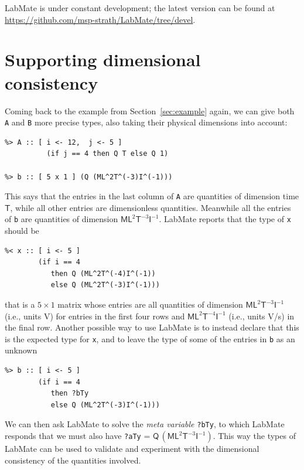 \documentclass{IMEKO2024}
\newcommand{\remph}{\emph}
\begin{document}
LabMate is under constant development; the latest version can be found at \url{https://github.com/msp-strath/LabMate/tree/devel}.

\section{Supporting dimensional consistency}
\label{sec:example-revisited}


Coming back to the example from Section~\ref{sec:example} again, we can give both \texttt{A} and \texttt{B} more precise types, also taking their physical dimensions into account:
\begin{verbatim}
%> A :: [ i <- 12,  j <- 5 ]
          (if j == 4 then Q T else Q 1)

%> b :: [ 5 x 1 ] (Q (ML^2T^(-3)I^(-1)))
\end{verbatim}
This says that the entries in the last column of \texttt{A} are quantities of dimension time $\mathsf{T}$, while all other entries are dimensionless quantities. Meanwhile all the entries of \texttt{b} are quantities of dimension $\mathsf{ML}^{2}\mathsf{T}^{-3}\mathsf{I}^{-1}$. LabMate reports that the type of \texttt{x} should be
\begin{verbatim}
%< x :: [ i <- 5 ]
        (if i == 4
           then Q (ML^2T^(-4)I^(-1))
           else Q (ML^2T^(-3)I^(-1)))
\end{verbatim}
that is a $5 \times 1$ matrix whose entries are all quantities of dimension $\mathsf{ML}^{2}\mathsf{T}^{-3}\mathsf{I}^{-1}$ (i.e., units V) for entries in the first four rows and $\mathsf{ML}^{2}\mathsf{T}^{-4}\mathsf{I}^{-1}$ (i.e., units V/s) in the final row.
%
Another possible way to use LabMate is to instead declare that this is the expected type for \texttt{x}, and to leave the type of some of the entries in \texttt{b} as an unknown
\begin{verbatim}
%> b :: [ i <- 5 ]
        (if i == 4
           then ?bTy
           else Q (ML^2T^(-3)I^(-1)))
\end{verbatim}
We can then ask LabMate to solve the \remph{meta variable} \texttt{?bTy}, to which LabMate responds that we must also have \texttt{?aTy} = $\mathsf{Q}\,(\mathsf{ML}^{2}\mathsf{T}^{-3}\mathsf{I}^{-1})$. This way the types of LabMate can be used to validate and experiment with the dimensional consistency of the quantities involved.

\end{document}
